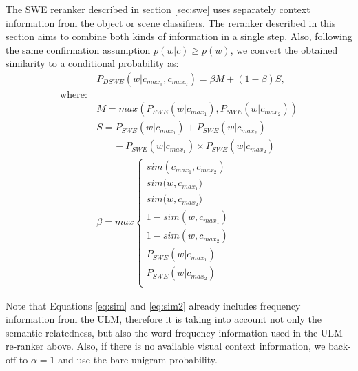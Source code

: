 \documentclass[phd,tocprelim]{cornell}
\begin{document}
The SWE reranker described in section \ref{sec:swe} uses separately context information from the object or scene classifiers. The reranker described in this section aims to combine both kinds of information in a single step.
Also, following  the same confirmation assumption $p(w|c) \geqslant p(w)$, we convert the obtained similarity to a conditional probability as:
 \begin{equation}
\begin{split}
\label{eq:sim2}
& P_{DSWE}(w\vert c_{max_{1}}, c_{max_{2}})= \beta M +(1- \beta)S, \\
\mathrm{where:}& \\
& M = max(P_{SWE}(w|c_{max_1}), P_{SWE}(w|c_{max_2}))\\
& S = P_{SWE}(w|c_{max_1})+P_{SWE}(w|c_{max_2})\\
& \:\:\:\:\:\:\:\:-P_{SWE}(w|c_{max_1})\times P_{SWE}(w|c_{max_2})\\
& \beta = max
\begin{cases}
\text{$sim(c_{max_{1}},c_{max_{2}})$}\\
\text{$sim(w, c_{max_{1}}$)}\\
\text{$sim(w, c_{max_{2}}$)} \\ 
\text{$1 - sim(w, c_{max_{1}})$} \\ 
\text{$1 - sim(w, c_{max_{2}})$} \\ 
\text{$P_{SWE}(w|c_{max_1})$} \\
\text{$P_{SWE}(w|c_{max_2})$} \\ 
\end{cases}      
\end{split}
\end{equation}


Note that Equations \ref{eq:sim} and \ref{eq:sim2} already includes frequency information from the ULM, therefore it is taking into account not only the semantic relatedness, but also the word frequency information used in the ULM re-ranker above. Also, if there is no available visual context information, we back-off to $\alpha=1$ and use the bare unigram probability.
\end{document}
